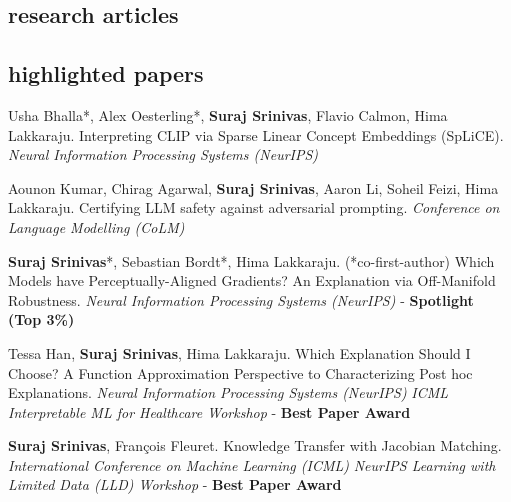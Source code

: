 \documentclass[11pt, a4paper, english]{moderncv}        %
\newcommand{\cvsection}[1]{\vspace{0.3cm}\subsection{\Large{{#1}}}}
\newcommand{\cvsubsection}[1]{\vspace{0.3cm}\subsection{\large{{#1}}}}
\begin{document}
\cvsection{research articles}


\cvsubsection{highlighted papers}

 {Usha Bhalla*, Alex Oesterling*, \textbf{Suraj Srinivas}, Flavio Calmon, Hima Lakkaraju. \newline Interpreting CLIP via Sparse Linear Concept Embeddings (SpLiCE).
\newline \textit{Neural Information Processing Systems (NeurIPS)}}

\vspace*{0.25em}

 {Aounon Kumar, Chirag Agarwal, \textbf{Suraj Srinivas}, Aaron Li, Soheil Feizi, Hima Lakkaraju. \newline Certifying LLM safety against adversarial prompting. 
\newline \textit{Conference on Language Modelling (CoLM)}}

\vspace*{0.25em}

 {\textbf{Suraj Srinivas}*, Sebastian Bordt*, Hima Lakkaraju. (*co-first-author) \newline Which Models have Perceptually-Aligned Gradients? An Explanation via Off-Manifold Robustness.
\newline \textit{Neural Information Processing Systems (NeurIPS)} - \textbf{Spotlight (Top 3\%)}}
\vspace*{0.25em}

 {Tessa Han, \textbf{Suraj Srinivas}, Hima Lakkaraju. 
\newline Which Explanation Should I Choose? A Function Approximation Perspective to Characterizing Post hoc Explanations.
\newline \textit{Neural Information Processing Systems (NeurIPS)} \newline \textit{ICML Interpretable ML for Healthcare Workshop} - \textbf{Best Paper Award}}
\vspace*{0.25em}

 {\textbf{Suraj Srinivas}, Fran\c{c}ois Fleuret.
\newline Knowledge Transfer with Jacobian Matching.
\newline \textit{International Conference on Machine Learning (ICML)}
\newline \textit{NeurIPS Learning with Limited Data (LLD) Workshop} - \textbf{Best Paper Award}
}
\vspace*{0.25em}
\end{document}
